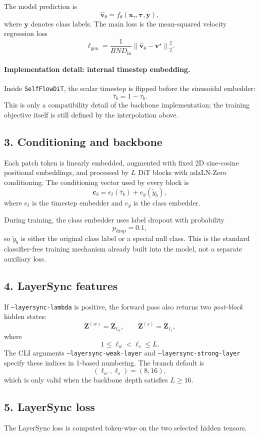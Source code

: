 \documentclass[11pt]{article}
\begin{document}
The model prediction is
\[
  \hat{\bm{v}}_\theta
  =
  f_\theta(\bm{x}_\tau,\bm{\tau},\bm{y}),
\]
where $\bm{y}$ denotes class labels.
The main loss is the mean-squared velocity regression loss
\[
  \ell_{\mathrm{gen}}
  =
  \frac{1}{BND_{\mathrm{in}}}
  \left\|
    \hat{\bm{v}}_\theta - \bm{v}^\star
  \right\|_2^2.
\]

\paragraph{Implementation detail: internal timestep embedding.}
Inside \texttt{SelfFlowDiT}, the scalar timestep is flipped before the sinusoidal embedder:
\[
  \bar{\tau}_b = 1 - \tau_b.
\]
This is only a compatibility detail of the backbone implementation; the training objective itself is still defined by the interpolation above.

\subsection*{3. Conditioning and backbone}
Each patch token is linearly embedded, augmented with fixed 2D sine-cosine positional embeddings, and processed by $L$ DiT blocks with adaLN-Zero conditioning. The conditioning vector used by every block is
\[
  \bm{c}_b = e_t(\bar{\tau}_b) + e_y(\tilde{y}_b),
\]
where $e_t$ is the timestep embedder and $e_y$ is the class embedder.

During training, the class embedder uses label dropout with probability
\[
  p_{\mathrm{drop}} = 0.1,
\]
so $\tilde{y}_b$ is either the original class label or a special null class. This is the standard classifier-free training mechanism already built into the model, not a separate auxiliary loss.

\subsection*{4. LayerSync features}
If \texttt{--layersync-lambda} is positive, the forward pass also returns two \emph{post-block} hidden states:
\[
  \bm{Z}^{(w)} = \bm{Z}_{\ell_w},
  \qquad
  \bm{Z}^{(s)} = \bm{Z}_{\ell_s},
\]
where
\[
  1 \le \ell_w < \ell_s \le L.
\]
The CLI arguments \texttt{--layersync-weak-layer} and \texttt{--layersync-strong-layer} specify these indices in 1-based numbering. The branch default is
\[
  (\ell_w,\ell_s) = (8,16),
\]
which is only valid when the backbone depth satisfies $L\ge 16$.

\subsection*{5. LayerSync loss}
The LayerSync loss is computed token-wise on the two selected hidden tensors.
\end{document}
